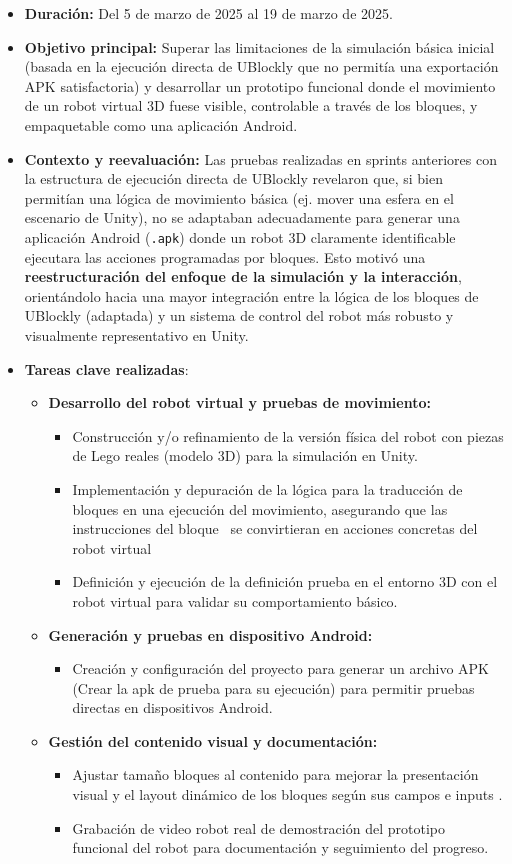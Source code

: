 \begin{itemize}
	\item \textbf{Duración:} Del 5 de marzo de 2025 al 19 de marzo de 2025. 
	\item \textbf{Objetivo principal:} Superar las limitaciones de la simulación básica inicial (basada en la ejecución directa de UBlockly que no permitía una exportación APK satisfactoria) y desarrollar un prototipo funcional donde el movimiento de un robot virtual 3D fuese visible, controlable a través de los bloques, y empaquetable como una aplicación Android.
	\item \textbf{Contexto y reevaluación:} Las pruebas realizadas en sprints anteriores con la estructura de ejecución directa de UBlockly revelaron que, si bien permitían una lógica de movimiento básica (ej. mover una esfera en el escenario de Unity), no se adaptaban adecuadamente para generar una aplicación Android (\texttt{.apk}) donde un robot 3D claramente identificable ejecutara las acciones programadas por bloques. Esto motivó una \textbf{reestructuración del enfoque de la simulación y la interacción}, orientándolo hacia una mayor integración entre la lógica de los bloques de UBlockly (adaptada) y un sistema de control del robot más robusto y visualmente representativo en Unity.
      \item \textbf{Tareas clave realizadas}:
\begin{itemize}
	\item \textbf{Desarrollo del robot virtual y pruebas de movimiento:}
	\begin{itemize}
		\item Construcción y/o refinamiento de la versión física del robot con piezas de Lego reales (modelo 3D) para la simulación en Unity.
		\item Implementación y depuración de la lógica para la traducción de bloques en una ejecución del movimiento, asegurando que las instrucciones del bloque \ se convirtieran en acciones concretas del robot virtual 
		\item Definición y ejecución de la definición prueba en el entorno 3D con el robot virtual para validar su comportamiento básico.
	\end{itemize}

	\item \textbf{Generación y pruebas en dispositivo Android:}
	\begin{itemize}
		\item Creación y configuración del proyecto para generar un archivo APK (Crear la apk de prueba para su ejecución) para permitir pruebas directas en dispositivos Android.
	\end{itemize}
	\item \textbf{Gestión del contenido visual y documentación:}
	\begin{itemize}
		\item Ajustar tamaño bloques al contenido para mejorar la presentación visual y el layout dinámico de los bloques según sus campos e inputs .
		\item Grabación de video robot real de demostración del prototipo funcional del robot para documentación y seguimiento del progreso.
	\end{itemize}
	


\end{itemize}
\end{itemize}
